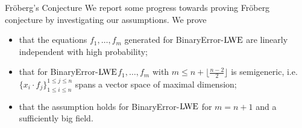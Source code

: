 \documentclass[10pt]{beamer}
\newcommand\LWE{\ensuremath{{\rm LWE}}\xspace}
\begin{document}
\begin{frame}[allowframebreaks]{Fröberg's Conjecture}
We report some progress towards proving Fr\"oberg conjecture by investigating our assumptions. We prove
\begin{itemize}       
\item that the equations $f_1,\ldots,f_m$ generated for BinaryError-\LWE are linearly independent with high probability;
\item that for BinaryError-\LWE $f_1,\ldots,f_m$ with $m \leq n+\lfloor \frac{n-2}{2} \rfloor$ is semigeneric, i.e.\ $\{x_i \cdot f_j \}_{1 \leq i \leq n}^{1 \leq j \leq n}$ spans a vector space of maximal dimension;
\item that the assumption holds for BinaryError-\LWE for $m=n+1$ and a sufficiently big field.
\end{itemize}

\end{frame}
\end{document}

